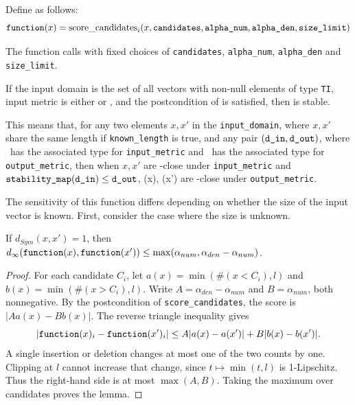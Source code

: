 \documentclass{article}
\begin{document}
\begin{theorem}
    Define \function as follows:
    \begin{equation*}
        \texttt{function}(x) = \mathrm{score\_candidates}_i(x, \texttt{candidates}, \texttt{alpha\_num}, \texttt{alpha\_den}, \texttt{size\_limit})
    \end{equation*}

    The function calls  with fixed choices of
    \texttt{candidates}, \texttt{alpha\_num}, \texttt{alpha\_den} and \texttt{size\_limit}.

    If the input domain is the set of all vectors with non-null elements of type \texttt{TI},
    input metric is either  or ,
    and the postcondition of \function is satisfied, then \function is stable.

    This means that, for any two elements $x, x'$ in the \texttt{input\_domain},
        where $x, x'$ share the same length if \texttt{known\_length} is true,
    and any pair $(\texttt{d\_in}, \texttt{d\_out})$,
        where \din\ has the associated type for \texttt{input\_metric} and \dout\ has the associated type for \texttt{output\_metric},
    then when $x, x'$ are \din-close under \texttt{input\_metric} and $\texttt{stability\_map}(\texttt{d\_in}) \leq \texttt{d\_out}$,
    \function(x), \function(x') are \dout-close under \texttt{output\_metric}.
\end{theorem}


The sensitivity of this function differs depending on whether the size of the input vector is known.
\label{unsized-stability}
First, consider the case where the size is unknown.

\begin{lemma}
    \label{single-change-stab-sym}
    If $d_{Sym}(x, x') = 1$, then $d_\infty(\texttt{function}(x), \texttt{function}(x')) \le \max(\alpha_{num}, \alpha_{den} - \alpha_{num})$.
\end{lemma}

\begin{proof}
    For each candidate $C_i$, let $a(x)=\min(\#(x<C_i),l)$ and $b(x)=\min(\#(x>C_i),l)$.
    Write $A=\alpha_{den}-\alpha_{num}$ and $B=\alpha_{num}$, both nonnegative.
    By the postcondition of \texttt{score\_candidates}, the score is $|Aa(x)-Bb(x)|$.
    The reverse triangle inequality gives
    \[
        |\texttt{function}(x)_i-\texttt{function}(x')_i|
        \leq A|a(x)-a(x')|+B|b(x)-b(x')|.
    \]
    A single insertion or deletion changes at most one of the two counts by one.
    Clipping at $l$ cannot increase that change, since $t\mapsto\min(t,l)$ is 1-Lipschitz.
    Thus the right-hand side is at most $\max(A,B)$.
    Taking the maximum over candidates proves the lemma.
\end{proof}
\end{document}
